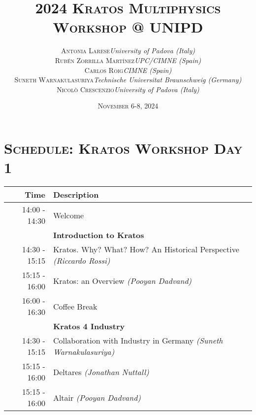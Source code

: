 \documentclass{article}
\begin{document}
\title{
   \Huge
   2024 \textsc{Kratos Multiphysics\\Workshop @ UNIPD}
}
\author{
   \small
   \begin{tabular}{rl}
      \textsc{Antonia Larese} & \textit{University of Padova (Italy)} \\
      \textsc{Rubén Zorrilla Martínez} & \textit{UPC/CIMNE (Spain)} \\
      \textsc{Carlos Roig} & \textit{CIMNE (Spain)} \\
      \textsc{Suneth Warnakulasuriya} & \textit{Technische Universitat Braunschweig (Germany)} \\
      \textsc{Nicol\`o Crescenzio} & \textit{University of Padova (Italy)}
   \end{tabular}
}
\date{\textsc{November} 6-8, 2024}
\maketitle

\section*{\centering\textsc{Schedule: Kratos Workshop Day 1}}

\begin{table}[h]\centering
   \begin{tabular}{r|l}
      \toprule\rule{0mm}{5mm}
      {\large Time} & {\large Description} \\[1ex]
      \midrule\rule{0mm}{4mm}
      14:00 - 14:30 & Welcome \\[1ex]
      \hline\rule{0mm}{5mm}
                    & {\large \textbf{Introduction to Kratos}} \\[1ex]
      14:30 - 15:15 & Kratos. Why? What? How? An Historical Perspective \textit{(Riccardo Rossi)}\\[1ex]
      15:15 - 16:00 & Kratos: an Overview \textit{(Pooyan Dadvand)}\\[1ex]
      \hline\rule{0mm}{5mm}
      16:00 - 16:30 & Coffee Break \\[1ex]
      \hline\rule{0mm}{5mm}
                    & {\large \textbf{Kratos 4 Industry}} \\[1ex]
      14:30 - 15:15 & Collaboration with Industry in Germany \textit{(Suneth Warnakulasuriya)}\\[1ex]
      15:15 - 16:00 & Deltares \textit{(Jonathan Nuttall)}\\[1ex]
      15:15 - 16:00 & Altair \textit{(Pooyan Dadvand)}\\[1ex]
      \bottomrule
   \end{tabular}
\end{table}
\end{document}
